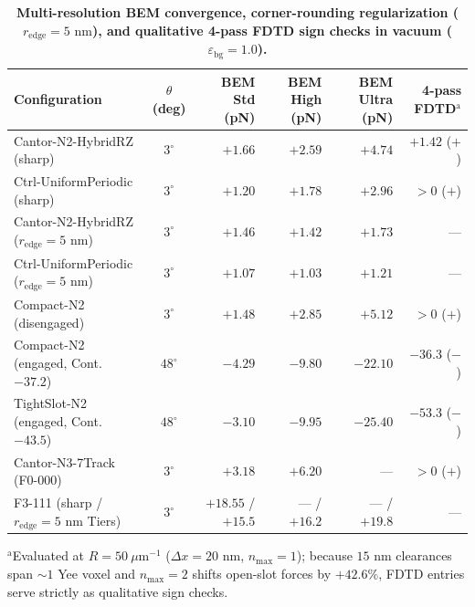\documentclass[11pt, a4paper]{article}
\begin{document}
\begin{table}[htbp]
\centering
\small
\caption{\textbf{Multi-resolution BEM convergence, corner-rounding regularization ($r_{\mathrm{edge}}=5\text{ nm}$), and qualitative 4-pass FDTD sign checks in vacuum ($\varepsilon_{\mathrm{bg}}=1.0$).}}
\label{tab:quantum_clutch}
\begin{tabular}{l c r r r r}
\toprule
Configuration & $\theta$ (deg) & BEM Std (pN) & BEM High (pN) & BEM Ultra (pN) & 4-pass FDTD$^{\mathrm{a}}$ \\
\midrule
Cantor-N2-HybridRZ (sharp) & $3^\circ$ & $+1.66$ & $+2.59$ & $+4.74$ & $+1.42$ ($+$) \\
Ctrl-UniformPeriodic (sharp) & $3^\circ$ & $+1.20$ & $+1.78$ & $+2.96$ & $>0$ ($+$) \\
Cantor-N2-HybridRZ ($r_{\mathrm{edge}}=5\text{ nm}$) & $3^\circ$ & $+1.46$ & $+1.42$ & $+1.73$ & --- \\
Ctrl-UniformPeriodic ($r_{\mathrm{edge}}=5\text{ nm}$) & $3^\circ$ & $+1.07$ & $+1.03$ & $+1.21$ & --- \\
Compact-N2 (disengaged) & $3^\circ$ & $+1.48$ & $+2.85$ & $+5.12$ & $>0$ ($+$) \\
Compact-N2 (engaged, Cont.\ $-37.2$) & $48^\circ$ & $-4.29$ & $-9.80$ & $-22.10$ & $-36.3$ ($-$) \\
TightSlot-N2 (engaged, Cont.\ $-43.5$) & $48^\circ$ & $-3.10$ & $-9.95$ & $-25.40$ & $-53.3$ ($-$) \\
Cantor-N3-7Track (F0-000) & $3^\circ$ & $+3.18$ & $+6.20$ & --- & $>0$ ($+$) \\
F3-111 (sharp / $r_{\mathrm{edge}}=5\text{ nm}$ Tiers) & $3^\circ$ & $+18.55$ / $+15.5$ & --- / $+16.2$ & --- / $+19.8$ & --- \\
\bottomrule
\end{tabular}
\par\smallskip\footnotesize
$^{\mathrm{a}}$Evaluated at $R=50\ \mu\text{m}^{-1}$ ($\Delta x = 20\text{ nm}$, $n_{\max}=1$); because $15\text{ nm}$ clearances span $\sim 1$ Yee voxel and $n_{\max}=2$ shifts open-slot forces by $+42.6\%$, FDTD entries serve strictly as qualitative sign checks.
\end{table}
\end{document}
